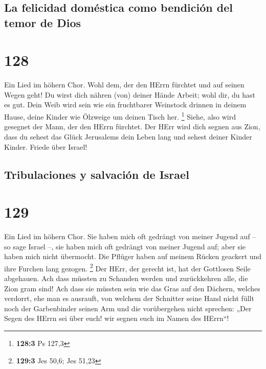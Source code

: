 \hypertarget{la-felicidad-domuxe9stica-como-bendiciuxf3n-del-temor-de-dios}{%
\subsection{La felicidad doméstica como bendición del temor de
Dios}\label{la-felicidad-domuxe9stica-como-bendiciuxf3n-del-temor-de-dios}}

\hypertarget{section-127}{%
\section{128}\label{section-127}}

 Ein Lied im höhern Chor. Wohl dem, der den HErrn fürchtet
und auf seinen Wegen geht!  Du wirst dich nähren (von)
deiner Hände Arbeit; wohl dir, du hast es gut.  Dein Weib
wird sein wie ein fruchtbarer Weinstock drinnen in deinem Hause, deine
Kinder wie Ölzweige um deinen Tisch her. \footnote{\textbf{128:3} Ps
  127,3}  Siehe, also wird gesegnet der Mann, der den
HErrn fürchtet.  Der HErr wird dich segnen aus Zion, dass
du sehest das Glück Jerusalems dein Leben lang  und sehest
deiner Kinder Kinder. Friede über Israel!

\hypertarget{tribulaciones-y-salvaciuxf3n-de-israel}{%
\subsection{Tribulaciones y salvación de
Israel}\label{tribulaciones-y-salvaciuxf3n-de-israel}}

\hypertarget{section-128}{%
\section{129}\label{section-128}}

 Ein Lied im höhern Chor. Sie haben mich oft gedrängt von
meiner Jugend auf -- so sage Israel --,  sie haben mich
oft gedrängt von meiner Jugend auf; aber sie haben mich nicht übermocht.
 Die Pflüger haben auf meinem Rücken geackert und ihre
Furchen lang gezogen. \footnote{\textbf{129:3} Jes 50,6; Jes 51,23}
 Der HErr, der gerecht ist, hat der Gottlosen Seile
abgehauen.  Ach dass müssten zu Schanden werden und
zurückkehren alle, die Zion gram sind!  Ach dass sie
müssten sein wie das Gras auf den Dächern, welches verdorrt, ehe man es
ausrauft,  von welchem der Schnitter seine Hand nicht
füllt noch der Garbenbinder seinen Arm  und die
vorübergehen nicht sprechen: „Der Segen des HErrn sei über euch! wir
segnen euch im Namen des HErrn``!

